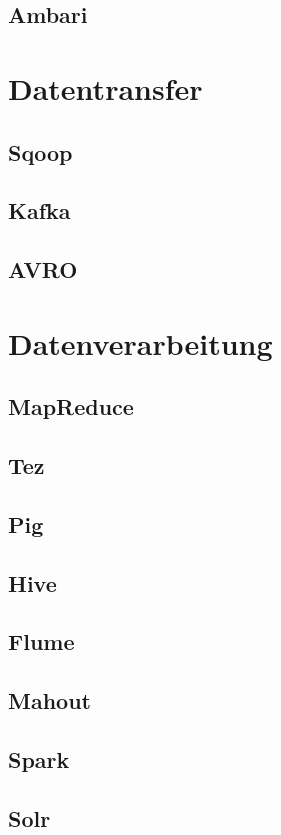 \subsection*{Ambari}

\section{Datentransfer}
\subsection*{Sqoop}
\subsection*{Kafka}
\subsection*{AVRO}

\section{Datenverarbeitung}
\subsection*{MapReduce}
\subsection*{Tez}
\subsection*{Pig}
\subsection*{Hive}
\subsection*{Flume}
\subsection*{Mahout}
\subsection*{Spark}
\subsection*{Solr}
